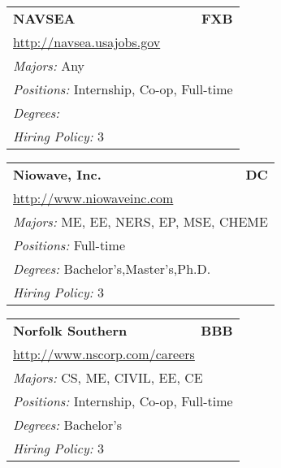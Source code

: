 \documentclass[twoside]{article}
\begin{document}
\begin{center}
\begin{multicols}{3}
\begin{FlushLeft}
\begin{minipage}{.9\columnwidth}
\end{minipage}
 
\begin{minipage}{.9\columnwidth}\begin{tabularx}{.95\columnwidth}{Xr}
                 {\Large\bf NAVSEA} & {\Large\bf FXB}\\
    \multicolumn{2}{p{.95\columnwidth}}{\url{http://navsea.usajobs.gov}}\\
    \multicolumn{2}{p{.95\columnwidth}}{\emph{Majors:} Any}\\
    \multicolumn{2}{p{.95\columnwidth}}{\emph{Positions:} Internship, Co-op, Full-time}\\
    \multicolumn{2}{p{.95\columnwidth}}{\emph{Degrees:} }\\
    \multicolumn{2}{p{.95\columnwidth}}{\emph{Hiring Policy:} 3}\\
    \end{tabularx}
    
\end{minipage}
 
\begin{minipage}{.9\columnwidth}\begin{tabularx}{.95\columnwidth}{Xr}
                 {\Large\bf Niowave, Inc.} & {\Large\bf DC}\\
    \multicolumn{2}{p{.95\columnwidth}}{\url{http://www.niowaveinc.com}}\\
    \multicolumn{2}{p{.95\columnwidth}}{\emph{Majors:} ME, EE, NERS, EP, MSE, CHEME}\\
    \multicolumn{2}{p{.95\columnwidth}}{\emph{Positions:} Full-time}\\
    \multicolumn{2}{p{.95\columnwidth}}{\emph{Degrees:} Bachelor's,Master's,Ph.D.}\\
    \multicolumn{2}{p{.95\columnwidth}}{\emph{Hiring Policy:} 3}\\
    \end{tabularx}
    
\end{minipage}
 
\begin{minipage}{.9\columnwidth}\begin{tabularx}{.95\columnwidth}{Xr}
                 {\Large\bf Norfolk Southern} & {\Large\bf BBB}\\
    \multicolumn{2}{p{.95\columnwidth}}{\url{http://www.nscorp.com/careers}}\\
    \multicolumn{2}{p{.95\columnwidth}}{\emph{Majors:} CS, ME, CIVIL, EE, CE}\\
    \multicolumn{2}{p{.95\columnwidth}}{\emph{Positions:} Internship, Co-op, Full-time}\\
    \multicolumn{2}{p{.95\columnwidth}}{\emph{Degrees:} Bachelor's}\\
    \multicolumn{2}{p{.95\columnwidth}}{\emph{Hiring Policy:} 3}\\
    \end{tabularx}
    

\end{minipage}
\end{FlushLeft}
\end{multicols}
\end{center}
\end{document}
